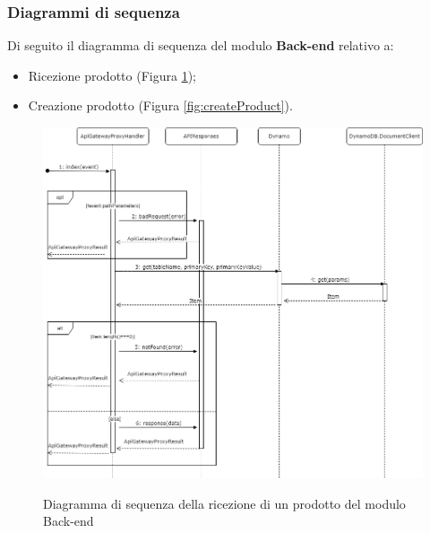 \subsubsection{Diagrammi di sequenza}
Di seguito il diagramma di sequenza del modulo \textbf{Back-end} relativo a:
\begin{itemize}
	\item Ricezione prodotto (Figura \ref{fig:getProduct});
	\item Creazione prodotto (Figura \ref{fig:createProduct}).
\end{itemize}

\vspace{1cm}

\begin{figure}[H]
\centering
\includegraphics[scale=0.43]{res/Architettura/Backend/img/diagrammaSequenzaRicezioneProdotto.png}\\
\caption{Diagramma di sequenza della ricezione di un prodotto del modulo Back-end}
\label{fig:getProduct}
\end{figure}

\vspace{1cm}

